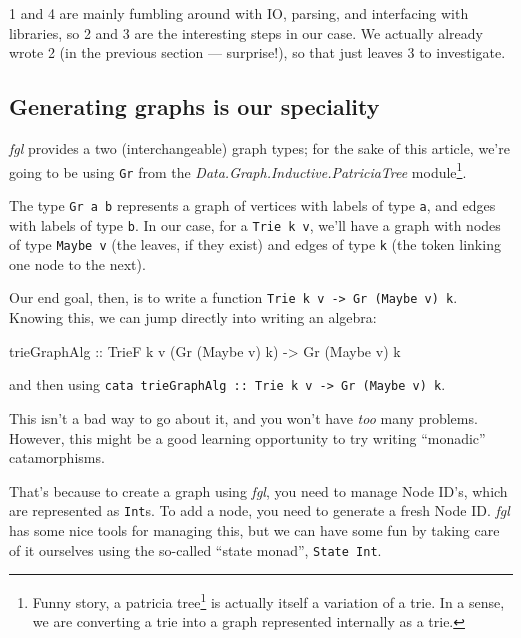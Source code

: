 \documentclass[]{article}
\newenvironment{Shaded}{}{}
\newcommand{\DataTypeTok}[1]{\textcolor[rgb]{0.56,0.13,0.00}{#1}}
\newcommand{\NormalTok}[1]{#1}
\newcommand{\OtherTok}[1]{\textcolor[rgb]{0.00,0.44,0.13}{#1}}
\renewcommand{\href}[2]{#2\footnote{\url{#1}}}
\begin{document}
1 and 4 are mainly fumbling around with IO, parsing, and interfacing with
libraries, so 2 and 3 are the interesting steps in our case. We actually already
wrote 2 (in the previous section --- surprise!), so that just leaves 3 to
investigate.

\hypertarget{generating-graphs-is-our-speciality}{%
\subsection{Generating graphs is our
speciality}\label{generating-graphs-is-our-speciality}}

\emph{fgl} provides a two (interchangeable) graph types; for the sake of this
article, we're going to be using \texttt{Gr} from the
\emph{Data.Graph.Inductive.PatriciaTree} module\footnote{Funny story, a
  \href{https://en.wikipedia.org/wiki/Radix_tree}{patricia tree} is actually
  itself a variation of a trie. In a sense, we are converting a trie into a
  graph represented internally as a trie.}.

The type \texttt{Gr\ a\ b} represents a graph of vertices with labels of type
\texttt{a}, and edges with labels of type \texttt{b}. In our case, for a
\texttt{Trie\ k\ v}, we'll have a graph with nodes of type \texttt{Maybe\ v}
(the leaves, if they exist) and edges of type \texttt{k} (the token linking one
node to the next).

Our end goal, then, is to write a function
\texttt{Trie\ k\ v\ -\textgreater{}\ Gr\ (Maybe\ v)\ k}. Knowing this, we can
jump directly into writing an algebra:

\begin{Shaded}
\begin{Highlighting}[]
\NormalTok{trieGraphAlg}
\OtherTok{    ::} \DataTypeTok{TrieF}\NormalTok{ k v (}\DataTypeTok{Gr}\NormalTok{ (}\DataTypeTok{Maybe}\NormalTok{ v) k)}
    \OtherTok{->} \DataTypeTok{Gr}\NormalTok{ (}\DataTypeTok{Maybe}\NormalTok{ v) k}
\end{Highlighting}
\end{Shaded}

and then using
\texttt{cata\ trieGraphAlg\ ::\ Trie\ k\ v\ -\textgreater{}\ Gr\ (Maybe\ v)\ k}.

This isn't a bad way to go about it, and you won't have \emph{too} many
problems. However, this might be a good learning opportunity to try writing
``monadic'' catamorphisms.

That's because to create a graph using \emph{fgl}, you need to manage Node ID's,
which are represented as \texttt{Int}s. To add a node, you need to generate a
fresh Node ID. \emph{fgl} has some nice tools for managing this, but we can have
some fun by taking care of it ourselves using the so-called ``state monad'',
\texttt{State\ Int}.
\end{document}
